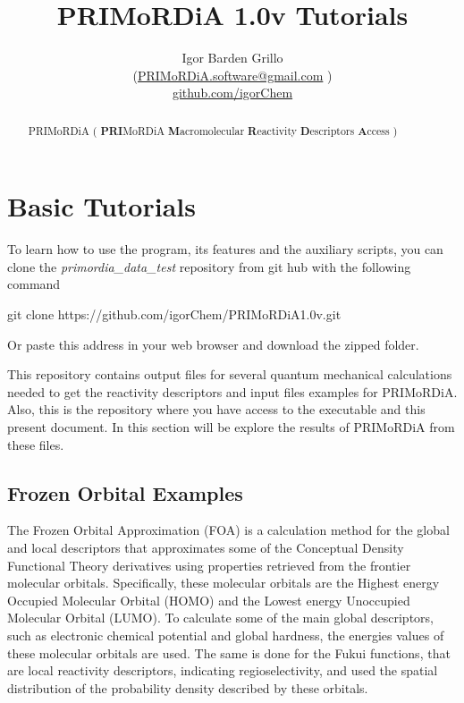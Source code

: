 \documentclass[a4paper,11pt]{refart}
\title{PRIMoRDiA 1.0v Tutorials}
\author{Igor Barden Grillo \\(\url{PRIMoRDiA.software@gmail.com} )\\\url{github.com/igorChem}}
\begin{document}
	\maketitle
	
\begin{abstract}
	PRIMoRDiA ( \textbf{PRI}MoRDiA \textbf{M}acromolecular \textbf{R}eactivity \textbf{D}escriptors \textbf{A}ccess )
\end{abstract}

\section{Basic Tutorials}

To learn how to use the program, its features and the auxiliary scripts, you can clone the \emph{primordia\_data\_test} repository from git hub with the following command

\hspace*{-\leftmarginwidth}
\begin{minipage}{\fullwidth}
	\begin{commandshell}git clone https://github.com/igorChem/PRIMoRDiA1.0v.git\end{commandshell}
\end{minipage}

Or paste this address in your web browser and download the zipped folder.

This repository contains output files for several quantum mechanical calculations needed to get the reactivity descriptors and input files examples for PRIMoRDiA. Also, this is the repository where you have access to the executable and this present document. In this section will be explore the results of PRIMoRDiA from these files.


\subsection{Frozen Orbital Examples}

The Frozen Orbital Approximation (FOA) is a calculation method for the global and local descriptors that approximates some of the Conceptual Density Functional Theory derivatives using properties retrieved from the frontier molecular orbitals. Specifically, these molecular orbitals are the Highest energy Occupied Molecular Orbital (HOMO) and the Lowest energy Unoccupied Molecular Orbital (LUMO). To calculate some of the main global descriptors, such as electronic chemical potential and global hardness, the energies values of these molecular orbitals are used. The same is done for the Fukui functions, that are local reactivity descriptors, indicating regioselectivity, and used the spatial distribution of the probability density described by these orbitals.
\end{document}
